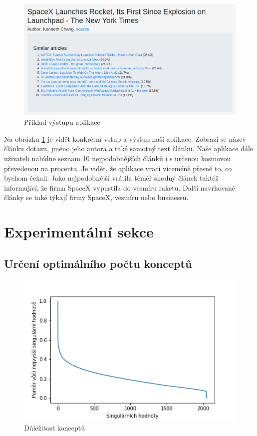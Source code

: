 \documentclass[11pt]{scrartcl} %
\begin{document}
\begin{figure}[h] %
	\centering
	\includegraphics[width=0.9\columnwidth]{images/output.png}
	\caption{Příklad výstupu aplikace}
	\label{fig:output}
\end{figure}

Na obrázku \ref{fig:output} je vidět konkrétní vstup a výstup naší aplikace. Zobrazí se název článku dotazu, jméno jeho autora a také samotný text článku. Naše aplikace dále uživateli nabídne seznam 10 nejpodobnějších článků i s určenou kosinovou převedenou na procenta. Je vidět, že aplikace vrací víceméně přesně to, co bychom čekali. Jako nejpodobnější vrátila téměř shodný článek taktéž informující, že firma SpaceX vypustila do vesmíru raketu. Další navrhované články se také týkají firmy SpaceX, vesmíru nebo businessu. 

\section{Experimentální sekce}

\subsection{Určení optimálního počtu konceptů}

\begin{figure}[h] %
	\centering
	\includegraphics[width=0.7\columnwidth]{images/singular_values.png}
	\caption{Důležitost konceptů}
	\label{fig:concepts}
\end{figure}
\end{document}
